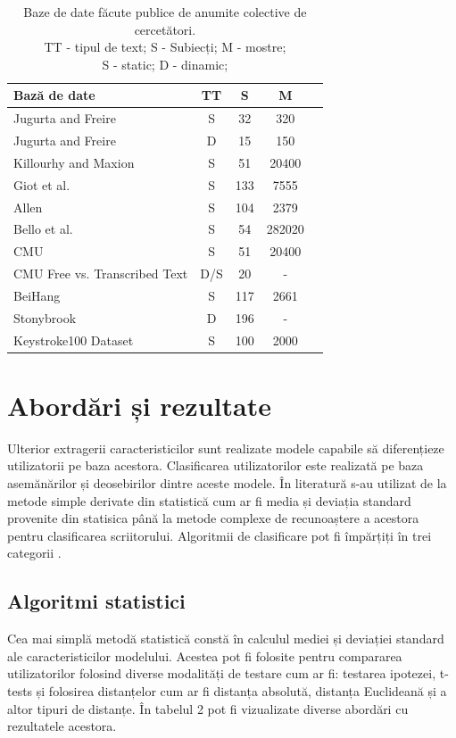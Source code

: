 \documentclass[9pt,shortpaper,twoside,web]{ieeecolor}
\begin{document}
\begin{table}[H]
	\begin{tabular}[c]{lcccc}
	\hline
	Bază de date 							 	   & TT  &   S &      M \\
	
	\hline
	Jugurta and Freire   \cite{b8}      		   &   S &  32 &    320 \\ 
	Jugurta and Freire   \cite{b8}      		   &   D &  15 &    150 \\ 
	Killourhy and Maxion \cite{b9}      		   &   S &  51 &  20400 \\ 
	Giot et al.			 \cite{b10}	    	 	   &   S & 133 &   7555 \\ 
	Allen				 \cite{b11}	    	 	   &   S & 104 &   2379 \\ 
	Bello et al.		 \cite{b12}	    	 	   &   S &  54 & 282020 \\ 
	CMU \cite{b13}  					 	 	   &   S &  51 &  20400 \\
	CMU Free vs. Transcribed Text \cite{b14} 	   & D/S &  20 & 	  - \\
	BeiHang \cite{b15}						 	   &   S & 117 &   2661 \\
	Stonybrook  \cite{b16}					 	   &   D & 196 & 	  - \\
	Keystroke100 Dataset \cite{b17, b18}           &   S & 100 &   2000 \\
	\hline
	\end{tabular}
	
\caption{ 
Baze de date făcute publice de anumite colective de cercetători.\\
TT - tipul de text; S - Subiecți; M - mostre;\\
S - static; D - dinamic;
}
\end{table}

\section{Abordări și rezultate}
	Ulterior extragerii caracteristicilor sunt realizate modele capabile să diferențieze utilizatorii pe baza acestora. Clasificarea utilizatorilor este realizată pe baza asemănărilor și deosebirilor dintre aceste modele. În literatură s-au utilizat de la metode simple derivate din statistică cum ar fi media și deviația standard provenite din statisica până la metode complexe de recunoaștere a acestora pentru clasificarea scriitorului. Algoritmii de clasificare pot fi împărțiți în trei categorii \cite{b3}.

\subsection{Algoritmi statistici}
	Cea mai simplă metodă statistică constă în calculul mediei și deviației standard ale caracteristicilor modelului. Acestea pot fi folosite pentru compararea utilizatorilor folosind diverse modalități de testare cum ar fi: testarea ipotezei, t-tests și folosirea distanțelor cum ar fi distanța absolută, distanța Euclideană și a altor tipuri de distanțe. În tabelul 2 pot fi vizualizate diverse abordări cu rezultatele acestora.\\
\end{document}
